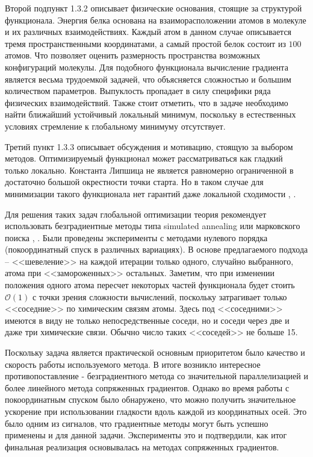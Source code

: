Второй подпункт 1.3.2 описывает физические основания, стоящие за структурой функционала. Энергия белка основана на взаиморасположении атомов в молекуле и их различных взаимодействиях. Каждый атом в данном случае описывается тремя пространственными координатами, а самый простой белок состоит из $100$ атомов. Что позволяет оценить размерность пространства возможных конфигураций молекулы. Для подобного функционала вычисление градиента является весьма трудоемкой задачей, что объясняется сложностью и большим количеством параметров. Выпуклость пропадает в силу специфики ряда физических взаимодействий. Также стоит отметить, что в задаче необходимо найти ближайший устойчивый локальный минимум, поскольку в естественных условиях стремление к глобальному минимуму отсутствует. 

Третий пункт 1.3.3 описывает обсуждения и мотивацию, стоящую за выбором методов. Оптимизируемый функционал может рассматриваться как гладкий только локально. Константа Липшица не является равномерно ограниченной в достаточно большой окрестности точки старта. Но в таком случае для минимизации такого функционала нет гарантий даже локальной сходимости \cite{ghadimi2015generalized}, \cite{nesterov2017random}.
   
Для решения таких задач глобальной оптимизации теория рекомендует использовать безградиентные методы типа simulated annealing или марковского поиска \cite{zhigljavsky2007stochastic}, \cite{zhigljavsky2012theory}.
Были проведены эксперименты с методами нулевого порядка (покоординатный спуск в различных вариациях). В основе предлагаемого подхода -- <<шевеление>> на каждой итерации только одного, случайно выбранного, атома при <<замороженных>> остальных. Заметим, что при изменении положения одного атома пересчет некоторых частей функционала будет стоить $\mathcal{O}\left( 1 \right)$ с точки зрения сложности вычислений, поскольку затрагивает только <<соседние>> по химическим связям атомы. Здесь под <<соседними>> имеются в виду не только непосредственные соседи, но и соседи через две и даже три химические связи. Обычно число таких <<соседей>> не больше 15. 

Поскольку задача является практической основным приоритетом было качество и скорость работы используемого метода. В итоге возникло интересное противопоставление - безградиентного метода со значительной параллелизацией и более линейного метода сопряженных градиентов. Однако во время работы с покоординатным спуском было обнаружено, что можно получить значительное ускорение при использовании гладкости вдоль каждой из координатных осей. Это было одним из сигналов, что градиентные методы могут быть успешно применены и для данной задачи. Эксперименты это и подтвердили, как итог финальная реализация основывалась на методах сопряженных градиентов.

